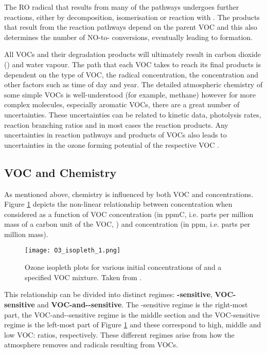 The RO radical that results from many of the  pathways undergoes further reactions, either by decomposition, isomerisation or reaction with . 
The products that result from the reaction pathways depend on the parent VOC and this also determines the number of NO-to- conversions, eventually leading to  formation.

All VOCs and their degradation products will ultimately result in carbon dioxide () and water vapour. 
The path that each VOC takes to reach its final products is dependent on the type of VOC, the radical concentration, the  concentration and other factors such as time of day and year. 
The detailed atmospheric chemistry of some simple VOCs is well-understood (for example, methane) however for more complex molecules, especially aromatic VOCs, there are a great number of uncertainties. 
These uncertainties can be related to kinetic data, photolysis rates, reaction branching ratios and in most cases the reaction products. 
Any uncertainties in reaction pathways and products of VOCs also leads to uncertainties in the ozone forming potential of the respective VOC \citep{Atkinson:2000}.

\subsection{\texorpdfstring{VOC and  Chemistry}{VOC and NOx Chemistry}} \label{s:VOC&NOx}
As mentioned above,  chemistry is influenced by both VOC and  concentrations. 
Figure \ref{f:O3_isopleth} depicts the non-linear relationship between  concentration when considered as a function of VOC concentration (in ppmC, i.e. parts per million mass of a carbon unit of the VOC, ) and  concentration (in ppm, i.e. parts per million mass). 
\begin{figure}
	\begin{center}
		\texttt{[image: O3\_isopleth\_1.png]}
		\caption{Ozone isopleth plots for various initial concentrations of  and a specified VOC mixture. Taken from \citep{Jenkin:2000}.}
		\label{f:O3_isopleth}
	\end{center}
\end{figure}

This relationship can be divided into distinct regimes: \textbf{-sensitive}, \textbf{VOC-sensitive} and \textbf{VOC-and--sensitive}. 
The -sensitive regime is the right-most part, the VOC-and--sensitive regime is the middle section and the VOC-sensitive regime is the left-most part of Figure \ref{f:O3_isopleth} and these correspond to high, middle and low VOC: ratios, respectively. 
These different regimes arise from how the atmosphere removes  and radicals resulting from VOCs. 

